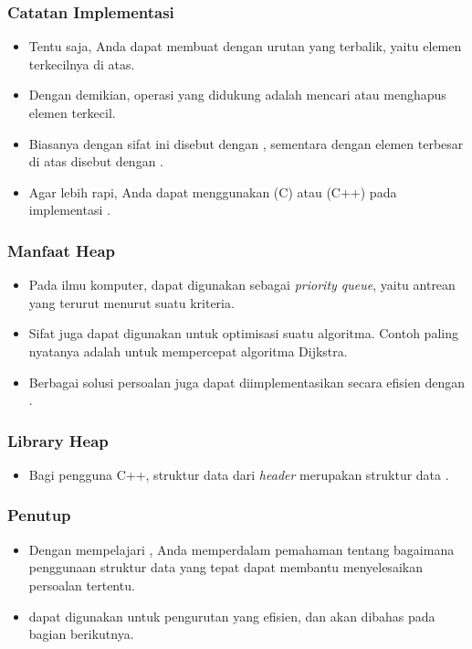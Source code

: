 \begin{frame}
\frametitle{Catatan Implementasi}
\begin{itemize}
  \item Tentu saja, Anda dapat membuat \pheap dengan urutan yang terbalik, yaitu elemen terkecilnya di atas.
  \item Dengan demikian, operasi yang didukung adalah mencari atau menghapus elemen terkecil.
  \item Biasanya \pheap dengan sifat ini disebut dengan , sementara \pheap dengan elemen terbesar di atas disebut dengan .
  \item Agar lebih rapi, Anda dapat menggunakan  (C) atau  (C++) pada implementasi \pheap.
\end{itemize}
\end{frame}

\begin{frame}
\frametitle{Manfaat Heap}
\begin{itemize}
  \item Pada ilmu komputer, \pheap dapat digunakan sebagai \textit{priority queue}, yaitu antrean yang terurut menurut suatu kriteria.
  \item Sifat \pheap juga dapat digunakan untuk optimisasi suatu algoritma. Contoh paling nyatanya adalah untuk mempercepat algoritma Dijkstra.
  \item Berbagai solusi persoalan \fgreedy juga dapat diimplementasikan secara efisien dengan \pheap.
\end{itemize}
\end{frame}

\begin{frame}
\frametitle{Library Heap}
\begin{itemize}
  \item Bagi pengguna C++, struktur data  dari \textit{header}  merupakan struktur data \pheap.
\end{itemize}
\end{frame}

\begin{frame}
\frametitle{Penutup}
\begin{itemize}
  \item Dengan mempelajari \pheap, Anda memperdalam pemahaman tentang bagaimana penggunaan struktur data yang tepat dapat membantu menyelesaikan persoalan tertentu.
  \item \pHeap dapat digunakan untuk pengurutan yang efisien, dan akan dibahas pada bagian berikutnya.
\end{itemize}
\end{frame}


